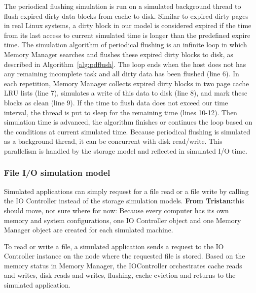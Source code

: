 \documentclass[conference]{IEEEtran}
\newcommand{\tristan}[1]{\color{orange}\textbf{From Tristan:}#1\color{black}}
\begin{document}
			The periodical flushing simulation is run on a simulated background thread 
			to flush expired dirty data blocks from cache to disk.
			Similar to expired dirty pages in real Linux systems, a dirty block in our model 
			is considered expired if the time from its last access to current simulated time 
			is longer than the predefined expire time.
			The simulation algorithm of periodical flushing is an infinite loop in which 
			Memory Manager searches and flushes these expired dirty blocks to disk, 
			as described in Algorithm~\ref{alg:pdflush}. 
			The loop ends when the host does not has any remaining incomplete task 
			and all dirty data has been flushed (line 6). 
			In each repetition, Memory Manager collects expired dirty blocks in two 
			page cache LRU lists (line 7), simulates a write of this data to disk (line 8), 
			and mark these blocks as clean (line 9).
			If the time to flush data does not exceed our time interval, the thread is put 
			to sleep for the remaining time (lines 10-12). 
			Then simulation time is advanced, the algorithm finishes or continues the loop 
			based on the conditions at current simulated time.
			Because periodical flushing is simulated as a background thread, it can be 
			concurrent with disk read/write. This parallelism is handled by the 
			storage model and reflected in simulated I/O time. 	

			\subsubsection{File I/O simulation model}			
			
			Simulated applications can simply request for a file read 
			or a file write by calling the IO Controller instead of 
			the storage simulation models. 
			\tristan{this should move, not sure where for now: Because every computer has its own memory and system configurations, 
			one IO Controller object and one Memory Manager object are created 
			for each simulated machine.}
			
			To read or write a file, a simulated application sends a request to the 
			IO Controller instance on the node where the requested file is stored.
			Based on the memory status in Memory Manager, the IOController 
			orchestrates cache reads and writes, disk reads and writes, flushing, cache eviction 
			 and returns to the simulated application.
			
\end{document}
